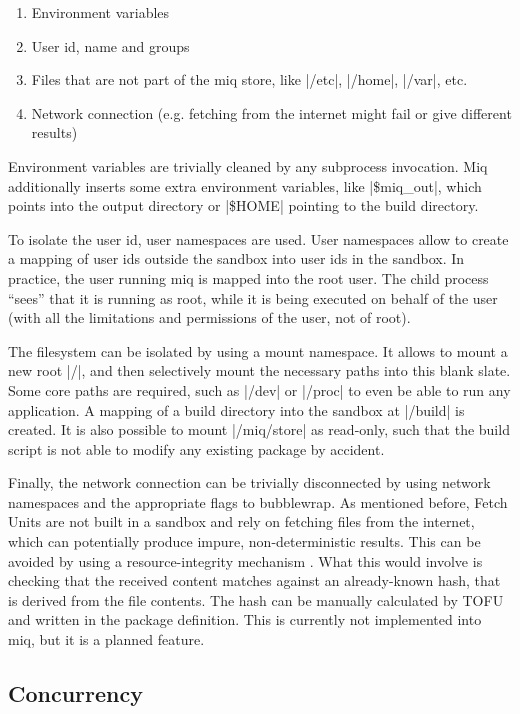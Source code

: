\begin{enumerate}
    \item Environment variables
    \item User id, name and groups
    \item Files that are not part of the miq store, like
    |/etc|, |/home|, |/var|, etc.
    \item Network connection (e.g. fetching from the
    internet might fail or give different results)
\end{enumerate}

Environment variables are trivially cleaned by any
subprocess invocation. Miq additionally inserts some extra
environment variables, like |\$miq_out|, which points into
the output directory or |\$HOME| pointing to the build
directory.

To isolate the user id, user namespaces are used. User
namespaces allow to create a mapping of user ids outside the
sandbox into user ids in the sandbox. In practice, the user
running miq is mapped into the root user. The child process
``sees'' that it is running as root, while it is being
executed on behalf of the user (with all the limitations and
permissions of the user, not of root).

The filesystem can be isolated by using a mount namespace.
It allows to mount a new root |/|,
and then selectively mount the necessary paths into this
blank slate. Some core paths are required, such as |/dev| or
|/proc| to even be able to run any application. A mapping of
a build directory into the sandbox at |/build| is created.
It is also possible to mount |/miq/store| as read-only, such
that the build script is not able to modify any existing
package by accident.

Finally, the network connection can be trivially
disconnected by using network namespaces and the appropriate
flags to bubblewrap. As mentioned before, Fetch Units are
not built in a sandbox and rely on fetching files from the
internet, which can potentially produce impure,
non-deterministic results. This can be avoided by using a
resource-integrity mechanism
\cite{chapuisEmpiricalStudyUse2020} . What this would
involve is checking that the received content matches
against an already-known hash, that is derived from the file
contents. The hash can be manually calculated by \acl{TOFU}
and written in the package definition. This is currently not
implemented into miq, but it is a planned feature.

\FloatBarrier
\subsection{Concurrency}

